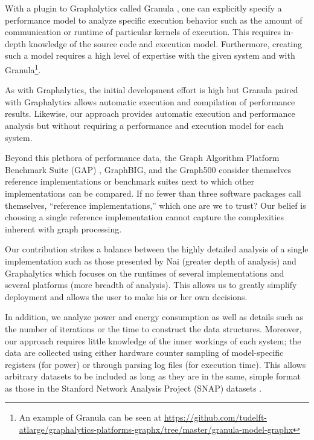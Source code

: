 \documentclass[conference]{IEEEtran}
\begin{document}
With a plugin to Graphalytics called Granula \cite{Ngai:2015:Granula}, one can explicitly specify a performance model to analyze specific execution behavior such as the amount of communication or runtime of particular kernels of execution. This requires in-depth knowledge of the source code and execution model. Furthermore, creating such a model requires a high level of expertise with the given system and with Granula\footnote{An example of Granula can be seen at \url{https://github.com/tudelft-atlarge/graphalytics-platforms-graphx/tree/master/granula-model-graphx}}.

As with Graphalytics, the initial development effort is high but Granula paired with Graphalytics allows automatic execution and compilation of performance results. Likewise, our approach provides automatic execution and performance analysis but without requiring a performance and execution model for each system.

Beyond this plethora of performance data, the Graph Algorithm Platform Benchmark Suite (GAP) \cite{Beamer:2015:GAPBench}, GraphBIG, and the Graph500 \cite{Murphy:2010:Graph500} consider themselves reference implementations or benchmark suites next to which other implementations can be compared. If no fewer than three software packages call themselves, ``reference implementations,'' which one are we to trust? Our belief is choosing a single reference implementation cannot capture the complexities inherent with graph processing.

Our contribution strikes a balance between the highly detailed analysis of a single implementation such as those presented by Nai \cite{Nai:2016:architectural} (greater depth of analysis) and Graphalytics which focuses on the runtimes of several implementations and several platforms (more breadth of analysis). This allows us to greatly simplify deployment and allows the user to make his or her own decisions.

In addition, we analyze  power and energy consumption as well as details such as the number of iterations or the time to construct the data structures. Moreover, our approach requires little knowledge of the inner workings of each system; the data are collected using either hardware counter sampling of model-specific registers (for power) or through parsing log files (for execution time). This allows arbitrary datasets to be included as long as they are in the same, simple format as those in the Stanford Network Analysis Project (SNAP) datasets \cite{snapnets}.
\end{document}
